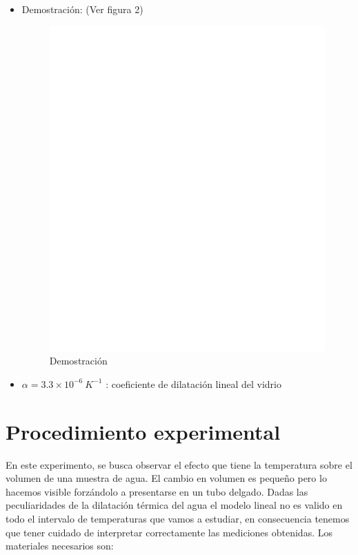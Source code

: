\documentclass[DIV=calc, paper=a4, fontsize=11pt, twocolumn, spanish]{scrartcl}	 %
\begin{document}
\begin{itemize}
\item Demostración: (Ver figura 2)

\begin{figure}[htbp]
\centering
	\includegraphics[scale=0.47]{data/img/figure03}
	\caption{Demostración}
\end{figure}

\item $\alpha = 3.3 \times 10^{-6}\ K^{-1}$ : coeficiente de dilatación lineal del vidrio  
\end{itemize}

\newpage

\section*{Procedimiento experimental}

En este experimento, se busca observar el efecto que tiene la temperatura sobre el volumen de una muestra de agua. El cambio en volumen es pequeño pero lo hacemos visible forzándolo a presentarse en un tubo delgado. Dadas las peculiaridades de la dilatación térmica del agua el modelo lineal no es valido en todo el intervalo de temperaturas que vamos a estudiar, en consecuencia tenemos que tener cuidado de interpretar correctamente las mediciones obtenidas. Los materiales necesarios son:
\end{document}

